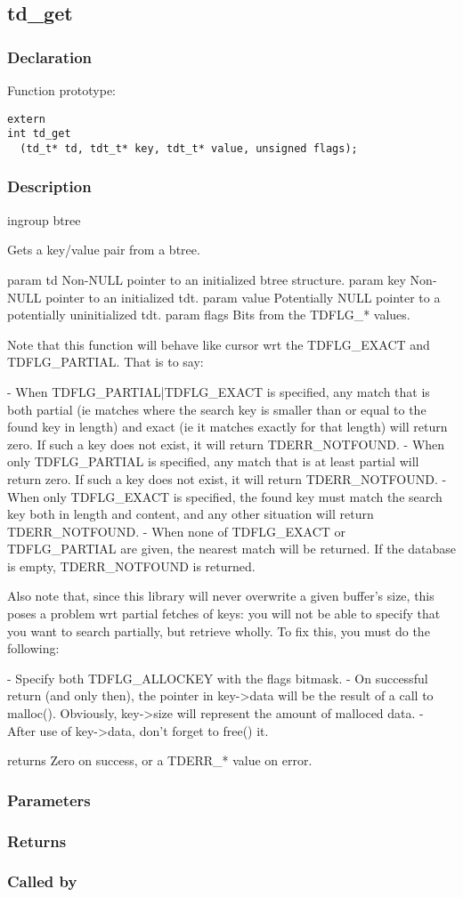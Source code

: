 
\newpage
\subsection{td\_get}
\subsubsection{Declaration} Function prototype:

\begin{verbatim}
extern
int td_get
  (td_t* td, tdt_t* key, tdt_t* value, unsigned flags);
\end{verbatim}

\subsubsection{Description}


 ingroup btree

 Gets a key/value pair from a btree.

 param td Non-NULL pointer to an initialized btree structure.
 param key Non-NULL pointer to an initialized tdt.
 param value Potentially NULL pointer to a potentially uninitialized tdt.
 param flags Bits from the TDFLG\_* values.

 Note that this function will behave like cursor wrt the TDFLG\_EXACT
 and TDFLG\_PARTIAL. That is to say:

 - When TDFLG\_PARTIAL|TDFLG\_EXACT is specified, any match that is both
   partial (ie matches where the search key is smaller than or equal to
   the found key in length) and exact (ie it matches exactly for that
   length) will return zero. If such a key does not exist, it will
   return TDERR\_NOTFOUND.
 - When only TDFLG\_PARTIAL is specified, any match that is at least
   partial will return zero. If such a key does not exist, it will
   return TDERR\_NOTFOUND.
 - When only TDFLG\_EXACT is specified, the found key must match the search
   key both in length and content, and any other situation will return
   TDERR\_NOTFOUND.
 - When none of TDFLG\_EXACT or TDFLG\_PARTIAL are given, the nearest match
   will be returned. If the database is empty, TDERR\_NOTFOUND is returned.

 Also note that, since this library will never overwrite
 a given buffer's size, this poses a problem wrt partial fetches of keys:
 you will not be able to specify that you want to search partially,
 but retrieve wholly. To fix this, you must do the following:

 - Specify both TDFLG\_ALLOCKEY with the flags bitmask.
 - On successful return (and only then), the pointer in key->data will
   be the result of a call to malloc(). Obviously, key->size will represent
   the amount of malloced data.
 - After use of key->data, don't forget to free() it.

 returns Zero on success, or a TDERR\_* value on error.
 

\subsubsection{Parameters}
\subsubsection{Returns}
\subsubsection{Called by}
